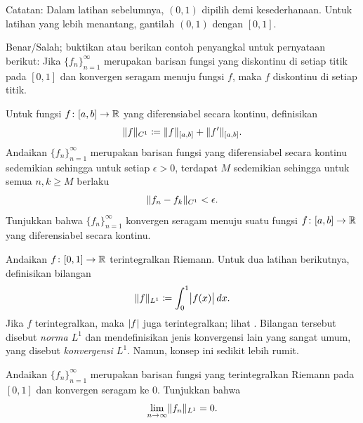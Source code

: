 \begin{exnote}
Catatan: Dalam latihan sebelumnya, $(0,1)$ dipilih demi kesederhanaan.  Untuk latihan yang
lebih menantang, gantilah $(0,1)$ dengan $[0,1]$.
\end{exnote}

\begin{exercise}
Benar/Salah; buktikan atau berikan contoh penyangkal untuk pernyataan berikut:
Jika $\{ f_n \}_{n=1}^\infty$ merupakan barisan fungsi yang diskontinu di setiap titik pada $[0,1]$
dan konvergen seragam menuju fungsi $f$, maka $f$ diskontinu di setiap
titik.
\end{exercise}

\begin{exercise} \label{c1uniflim:exercise}
Untuk fungsi $f \colon [a,b] \to {\mathbb{R}}$ yang diferensiabel secara kontinu, definisikan
\begin{equation*}
\lVert {f} \rVert_{C^1} \coloneqq \lVert {f} \rVert_{[a,b]} + \lVert {f'} \rVert_{[a,b]} .
\end{equation*}
Andaikan $\{ f_n \}_{n=1}^\infty$ merupakan barisan fungsi yang diferensiabel secara
kontinu sedemikian sehingga untuk setiap $\epsilon >0$, terdapat $M$
sedemikian sehingga untuk semua $n,k \geq M$ berlaku
\begin{equation*}
\lVert {f_n-f_k} \rVert_{C^1} < \epsilon .
\end{equation*}
Tunjukkan bahwa $\{ f_n \}_{n=1}^\infty$ konvergen seragam menuju suatu fungsi
$f \colon [a,b] \to {\mathbb{R}}$ yang diferensiabel secara kontinu.
\end{exercise}

\begin{exnote}
Andaikan
$f \colon [0,1] \to {\mathbb{R}}$ terintegralkan Riemann.
Untuk dua latihan berikutnya, definisikan
bilangan
\begin{equation*}
\lVert {f} \rVert_{L^1} \coloneqq 
\int_0^1 \bigl\lvert {f(x)} \bigr\rvert\,dx .
\end{equation*}
Jika $f$ terintegralkan, maka $\lvert {f} \rvert$ juga terintegralkan; lihat
.
Bilangan tersebut disebut \emph{norma $L^1$} dan
mendefinisikan jenis konvergensi lain yang sangat umum,
yang disebut
\emph{konvergensi $L^1$}.
Namun, konsep ini sedikit lebih rumit.
\end{exnote}

\begin{exercise}
Andaikan $\{ f_n \}_{n=1}^\infty$ merupakan barisan fungsi yang terintegralkan Riemann pada $[0,1]$
dan konvergen seragam
ke $0$.  Tunjukkan bahwa
\begin{equation*}
\lim_{n\to\infty} \lVert {f_n} \rVert_{L^1} = 0 .
\end{equation*}
\end{exercise}


